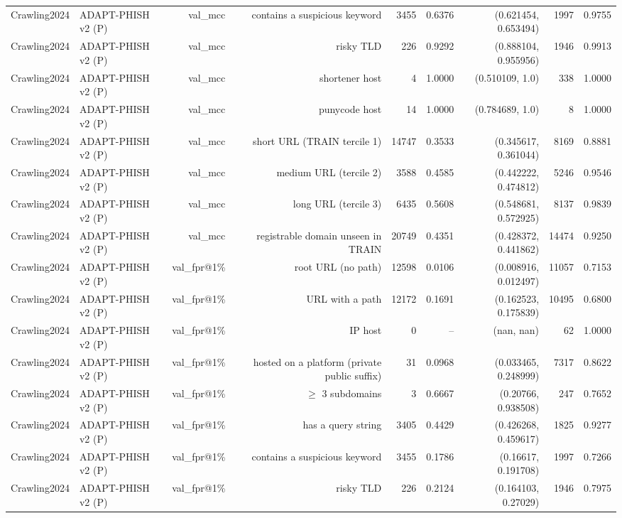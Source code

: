 \begin{table}[t]
\begin{tabular}{llrrrrrrr}
Crawling2024 & ADAPT-PHISH v2 (P) & val\_mcc & contains a suspicious keyword & 3455 & 0.6376 & (0.621454, 0.653494) & 1997 & 0.9755 \\
Crawling2024 & ADAPT-PHISH v2 (P) & val\_mcc & risky TLD & 226 & 0.9292 & (0.888104, 0.955956) & 1946 & 0.9913 \\
Crawling2024 & ADAPT-PHISH v2 (P) & val\_mcc & shortener host & 4 & 1.0000 & (0.510109, 1.0) & 338 & 1.0000 \\
Crawling2024 & ADAPT-PHISH v2 (P) & val\_mcc & punycode host & 14 & 1.0000 & (0.784689, 1.0) & 8 & 1.0000 \\
Crawling2024 & ADAPT-PHISH v2 (P) & val\_mcc & short URL (TRAIN tercile 1) & 14747 & 0.3533 & (0.345617, 0.361044) & 8169 & 0.8881 \\
Crawling2024 & ADAPT-PHISH v2 (P) & val\_mcc & medium URL (tercile 2) & 3588 & 0.4585 & (0.442222, 0.474812) & 5246 & 0.9546 \\
Crawling2024 & ADAPT-PHISH v2 (P) & val\_mcc & long URL (tercile 3) & 6435 & 0.5608 & (0.548681, 0.572925) & 8137 & 0.9839 \\
Crawling2024 & ADAPT-PHISH v2 (P) & val\_mcc & registrable domain unseen in TRAIN & 20749 & 0.4351 & (0.428372, 0.441862) & 14474 & 0.9250 \\
Crawling2024 & ADAPT-PHISH v2 (P) & val\_fpr@1\% & root URL (no path) & 12598 & 0.0106 & (0.008916, 0.012497) & 11057 & 0.7153 \\
Crawling2024 & ADAPT-PHISH v2 (P) & val\_fpr@1\% & URL with a path & 12172 & 0.1691 & (0.162523, 0.175839) & 10495 & 0.6800 \\
Crawling2024 & ADAPT-PHISH v2 (P) & val\_fpr@1\% & IP host & 0 & -- & (nan, nan) & 62 & 1.0000 \\
Crawling2024 & ADAPT-PHISH v2 (P) & val\_fpr@1\% & hosted on a platform (private public suffix) & 31 & 0.0968 & (0.033465, 0.248999) & 7317 & 0.8622 \\
Crawling2024 & ADAPT-PHISH v2 (P) & val\_fpr@1\% & $\geq$ 3 subdomains & 3 & 0.6667 & (0.20766, 0.938508) & 247 & 0.7652 \\
Crawling2024 & ADAPT-PHISH v2 (P) & val\_fpr@1\% & has a query string & 3405 & 0.4429 & (0.426268, 0.459617) & 1825 & 0.9277 \\
Crawling2024 & ADAPT-PHISH v2 (P) & val\_fpr@1\% & contains a suspicious keyword & 3455 & 0.1786 & (0.16617, 0.191708) & 1997 & 0.7266 \\
Crawling2024 & ADAPT-PHISH v2 (P) & val\_fpr@1\% & risky TLD & 226 & 0.2124 & (0.164103, 0.27029) & 1946 & 0.7975 \\

\end{tabular}
\end{table}
